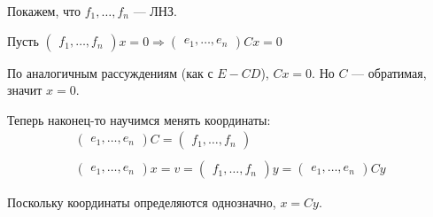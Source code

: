 Покажем, что \( f_1, \ldots, f_n \) --- ЛНЗ.

Пусть
\(
    \begin{pmatrix}
        f_1, \ldots, f_n
    \end{pmatrix}
    x
    =
    0
    \Rightarrow
    \begin{pmatrix}
        e_1, \ldots, e_n
    \end{pmatrix}
    Cx
    =
    0
\)

По аналогичным рассуждениям (как с \( E - CD \)), \( Cx = 0 \).
Но \( C \) --- обратимая, значит \( x = 0 \).

Теперь наконец-то научимся менять координаты:
\begin{gather*}
    \begin{pmatrix}
        e_1, \ldots, e_n
    \end{pmatrix}
    C
    =
    \begin{pmatrix}
        f_1, \ldots, f_n
    \end{pmatrix}
    \\
    \\
    \begin{pmatrix}
        e_1, \ldots, e_n
    \end{pmatrix}
    x
    =
    v
    =
    \begin{pmatrix}
        f_1, \ldots, f_n
    \end{pmatrix}
    y
    =
    \begin{pmatrix}
        e_1, \ldots, e_n
    \end{pmatrix}
    Cy
\end{gather*}

Поскольку координаты определяются однозначно, \( x = Cy \).
